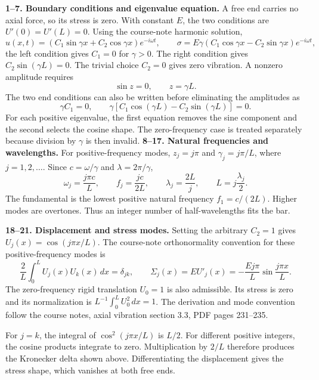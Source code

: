 \textbf{1--7. Boundary conditions and eigenvalue equation.} A free end carries no axial force, so its stress is zero. With constant $E$, the two conditions are $U'(0)=U'(L)=0$. Using the course-note harmonic solution,
\[
u(x,t)=\left(C_1\sin\gamma x+C_2\cos\gamma x\right)e^{-i\omega t},
\qquad \sigma=E\gamma\left(C_1\cos\gamma x-C_2\sin\gamma x\right)e^{-i\omega t},
\]
the left condition gives $C_1=0$ for $\gamma>0$. The right condition gives $C_2\sin(\gamma L)=0$. The trivial choice $C_2=0$ gives zero vibration. A nonzero amplitude requires
\[
\boxed{\sin z=0,\qquad z=\gamma L.}
\]
The two end conditions can also be written before eliminating the amplitudes as
\[
\gamma C_1=0,\qquad
\gamma\left[C_1\cos(\gamma L)-C_2\sin(\gamma L)\right]=0.
\]
For each positive eigenvalue, the first equation removes the sine component and the second selects the cosine shape. The zero-frequency case is treated separately because division by $\gamma$ is then invalid.
\textbf{8--17. Natural frequencies and wavelengths.} For positive-frequency modes, $z_j=j\pi$ and $\gamma_j=j\pi/L$, where $j=1,2,\ldots$. Since $c=\omega/\gamma$ and $\lambda=2\pi/\gamma$,
\[
\boxed{\omega_j=\frac{j\pi c}{L},\qquad f_j=\frac{jc}{2L},\qquad \lambda_j=\frac{2L}{j},\qquad L=j\frac{\lambda_j}{2}.}
\]
The fundamental is the lowest positive natural frequency $f_1=c/(2L)$. Higher modes are overtones. Thus an integer number of half-wavelengths fits the bar.

\textbf{18--21. Displacement and stress modes.} Setting the arbitrary $C_2=1$ gives $U_j(x)=\cos(j\pi x/L)$. The course-note orthonormality convention for these positive-frequency modes is
\[
\boxed{\frac{2}{L}\int_0^L U_j(x)U_k(x)\,dx=\delta_{jk},
\qquad \Sigma_j(x)=E U'_j(x)=-\frac{Ej\pi}{L}\sin\frac{j\pi x}{L}.}
\]
The zero-frequency rigid translation $U_0=1$ is also admissible. Its stress is zero and its normalization is $L^{-1}\int_0^L U_0^2\,dx=1$. The derivation and mode convention follow the course notes, axial vibration section 3.3, PDF pages 231--235.

For $j=k$, the integral of $\cos^2(j\pi x/L)$ is $L/2$. For different positive integers, the cosine products integrate to zero. Multiplication by $2/L$ therefore produces the Kronecker delta shown above. Differentiating the displacement gives the stress shape, which vanishes at both free ends.
